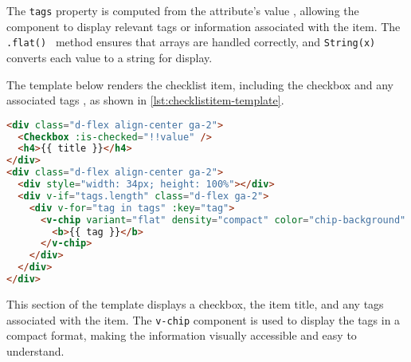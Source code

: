 The \texttt{tags} property is computed from the attribute’s value
, allowing the component to display relevant tags or information associated with the item. The \texttt{.flat()
} method ensures that arrays are handled correctly, and \texttt{String(x)} converts each value to a string for display.

The template below renders the checklist item, including the checkbox and any associated tags
, as shown in \ref{lst:checklistitem-template}.

\begin{lstlisting}[language=HTML, caption={Rendering the Checklist Item (\texttt{ChecklistItem.vue})},
  firstnumber=21,label={lst:checklistitem-template}]
<div class="d-flex align-center ga-2">
  <Checkbox :is-checked="!!value" />
  <h4>{{ title }}</h4>
</div>
<div class="d-flex align-center ga-2">
  <div style="width: 34px; height: 100%"></div>
  <div v-if="tags.length" class="d-flex ga-2">
    <div v-for="tag in tags" :key="tag">
      <v-chip variant="flat" density="compact" color="chip-background" label>
        <b>{{ tag }}</b>
      </v-chip>
    </div>
  </div>
</div>
\end{lstlisting}

This section of the template displays a checkbox, the item title, and any tags associated
with the item. The \texttt{v-chip} component is used to display the tags in a compact format, making the information
visually accessible and easy to understand.
